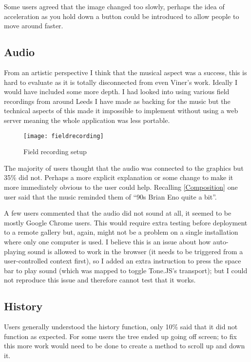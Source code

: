 Some users agreed that the image changed too slowly, perhaps the idea of
acceleration as you hold down a button could be introduced to allow people to
move around faster.

\subsection{Audio}
From an artistic perspective I think that the musical aspect was a success, this
is hard to evaluate as it is totally disconnected from even Viner's work.
Ideally I would have included some more depth. I had looked into using various
field recordings from around Leeds I have made as backing for the music but the
technical aspects of this made it impossible to implement without using a
web server meaning the whole application was less portable.

\begin{figure}[H]
    \centering
    \texttt{[image: fieldrecording]}
    \caption{Field recording setup}
\end{figure}

The majority of users thought that the audio was connected to the graphics but
35\% did not. Perhaps a more explicit explanation or some change to make it more
immediately obvious to the user could help. Recalling \autoref{Composition} one
user said that the music reminded them of ``90s Brian Eno quite a bit''.

A few users commented that the audio did not sound at all, it seemed to be
mostly Google Chrome users. This would require extra testing before deployment
to a remote gallery but, again, might not be a problem on a single installation
where only one computer is used. I believe this is an issue about how
auto-playing sound is allowed to work in the browser (it needs to be triggered
from a user-controlled context first), so I added an extra instruction to press
the space bar to play sound (which was mapped to toggle Tone.JS's transport);
but I could not reproduce this issue and therefore cannot test that it works.

\subsection{History}
Users generally understood the history function, only 10\% said that it did not
function as expected. For some users the tree ended up going off screen; to fix
this more work would need to be done to create a method to scroll up and down
it.

